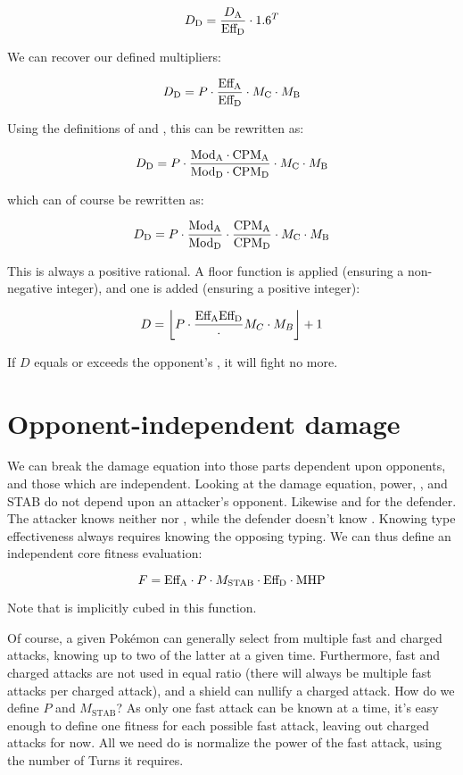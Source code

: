 \[ D_\mathrm{D} = \frac{D_\mathrm{A}}{\mbox{$\text{Eff}_\text{D}$}} \cdot 1.6^T \]

We can recover our defined multipliers:

\[ D_\mathrm{D} = P \cdot \frac{\mbox{$\text{Eff}_\text{A}$}}{\mbox{$\text{Eff}_\text{D}$}} \cdot M_\mathrm{C} \cdot M_\mathrm{B} \]

Using the definitions of  and , this can be rewritten as:

\[ D_\mathrm{D} = P \cdot \frac{\mbox{$\text{Mod}_\text{A}$} \cdot \mbox{CPM}_\mathrm{A}}{\mbox{$\text{Mod}_\text{D}$} \cdot \mbox{CPM}_\mathrm{D}} \cdot M_\mathrm{C} \cdot M_\mathrm{B} \]

which can of course be rewritten as:

\[ D_\mathrm{D} = P \cdot \frac{\mbox{$\text{Mod}_\text{A}$}}{\mbox{$\text{Mod}_\text{D}$}} \cdot \frac{\mbox{CPM}_\mathrm{A}}{\mbox{CPM}_\mathrm{D}} \cdot M_\mathrm{C} \cdot M_\mathrm{B} \]

This is always a positive rational.
A floor function is applied (ensuring a non-negative integer),
 and one is added (ensuring a positive integer):

\[ D = \left\lfloor P \cdot \frac{{\mbox{$\text{Eff}_\text{A}$}}{\mbox{$\text{Eff}_\text{D}$}}} \cdot M_C \cdot M_B \right\rfloor + 1 \]

If $D$ equals or exceeds the opponent's \HP, it will fight no more.

\section{Opponent-independent damage}
We can break the damage equation into those parts dependent upon opponents, and those which are independent.
Looking at the damage equation, power, , and STAB do not depend upon an attacker's opponent.
Likewise  and \MHP{} for the defender.
The attacker knows neither  nor \MHP, while the defender doesn't know .
Knowing type effectiveness always requires knowing the opposing typing.
We can thus define an independent core fitness evaluation:

\[ F = \mbox{$\text{Eff}_\text{A}$} \cdot P \cdot M_\mathrm{STAB} \cdot \mbox{$\text{Eff}_\text{D}$} \cdot \mbox{MHP} \]

Note that \CPM{} is implicitly cubed in this function.

Of course, a given Pokémon can generally select from multiple fast and charged attacks,
  knowing up to two of the latter at a given time.
Furthermore, fast and charged attacks are not used in equal ratio (there will
  always be multiple fast attacks per charged attack), and a shield can
  nullify a charged attack.
How do we define $P$ and $M_\mathrm{STAB}$?
As only one fast attack can be known at a time, it's easy enough to define one
  fitness for each possible fast attack, leaving out charged attacks for now.
All we need do is normalize the power of the fast attack, using the number of
  Turns it requires.

